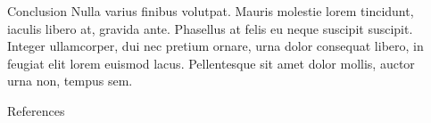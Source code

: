 \documentclass[final]{beamer}
\newlength{\sepwidth}
\newlength{\colwidth}
\newcommand{\separatorcolumn}{\begin{column}{\sepwidth}\end{column}}
\begin{document}
\begin{frame}[t]
\begin{columns}[t]
\begin{column}{\colwidth}
\begin{block}{Conclusion}
				Nulla varius finibus volutpat. Mauris molestie lorem tincidunt, iaculis
				libero at, gravida ante. Phasellus at felis eu neque suscipit suscipit.
				Integer ullamcorper, dui nec pretium ornare, urna dolor consequat libero,
				in feugiat elit lorem euismod lacus. Pellentesque sit amet dolor mollis,
				auctor urna non, tempus sem.
				
			\end{block}
			
			
			\begin{block}{References}
				\printbibliography[heading=none]
			\end{block}
		\end{column}
		
		\separatorcolumn
	\end{columns}
\end{frame}
\end{document}
